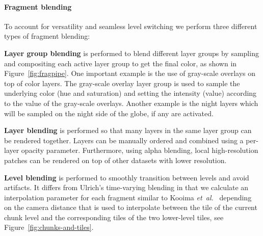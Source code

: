 \documentclass[journal]{vgtc}                %
\newcommand{\fig}[1]{Figure~\ref{fig:#1}}
\newcommand{\etal}{\emph{et~al.}}
\begin{document}
\vspace*{-1.5mm}
\paragraph{Fragment blending} \label{sec:fragment_blending}
To account for versatility and seamless level switching %
we perform three different types of fragment blending:

\noindent\textbf{Layer group blending} is performed to blend different layer groups by sampling and compositing each active layer group to get the final color, as shown in \fig{fragpipe}.
One important example is the use of gray-scale overlays on top of color layers.
The gray-scale overlay layer group is used to sample the underlying color (hue and saturation) and setting the intensity (value) according to the value of the gray-scale overlays.
Another example is the night layers which will be sampled on the night side of the globe, if any are activated.

\noindent\textbf{Layer blending} is performed so that many layers in the same layer group can be rendered together. Layers can be manually ordered and combined using a per-layer opacity parameter. Furthermore, using alpha blending, local high-resolution patches can be rendered on top of other datasets with lower resolution.

\noindent\textbf{Level blending} is performed to smoothly transition between levels and avoid artifacts. It differs from Ulrich's time-varying blending \cite{ulrich2002rendering} in that we calculate an interpolation parameter for each fragment similar to Kooima \etal ~\cite{kooima2009planetary} depending on the camera distance that is used to interpolate between the tile of the current chunk level and the corresponding tiles of the two lower-level tiles, see Figure~\ref{fig:chunks-and-tiles}.

\iffalse
\end{document}
